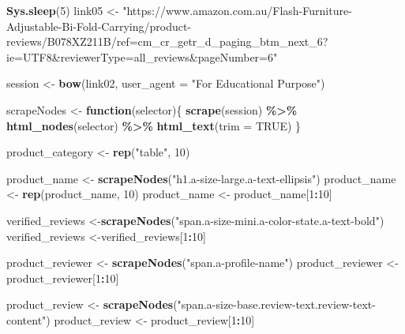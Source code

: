 \documentclass[
]{article}
\newenvironment{Shaded}{\begin{snugshade}}{\end{snugshade}}
\newcommand{\AttributeTok}[1]{\textcolor[rgb]{0.13,0.29,0.53}{#1}}
\newcommand{\ConstantTok}[1]{\textcolor[rgb]{0.56,0.35,0.01}{#1}}
\newcommand{\ControlFlowTok}[1]{\textcolor[rgb]{0.13,0.29,0.53}{\textbf{#1}}}
\newcommand{\DecValTok}[1]{\textcolor[rgb]{0.00,0.00,0.81}{#1}}
\newcommand{\FunctionTok}[1]{\textcolor[rgb]{0.13,0.29,0.53}{\textbf{#1}}}
\newcommand{\NormalTok}[1]{#1}
\newcommand{\OtherTok}[1]{\textcolor[rgb]{0.56,0.35,0.01}{#1}}
\newcommand{\SpecialCharTok}[1]{\textcolor[rgb]{0.81,0.36,0.00}{\textbf{#1}}}
\newcommand{\StringTok}[1]{\textcolor[rgb]{0.31,0.60,0.02}{#1}}
\begin{document}
\begin{Shaded}
\begin{Highlighting}[]
   \FunctionTok{Sys.sleep}\NormalTok{(}\DecValTok{5}\NormalTok{)}
\NormalTok{link05 }\OtherTok{\textless{}{-}} \StringTok{"https://www.amazon.com.au/Flash{-}Furniture{-}Adjustable{-}Bi{-}Fold{-}Carrying/product{-}reviews/B078XZ211B/ref=cm\_cr\_getr\_d\_paging\_btm\_next\_6?ie=UTF8\&reviewerType=all\_reviews\&pageNumber=6"}


\NormalTok{  session }\OtherTok{\textless{}{-}} \FunctionTok{bow}\NormalTok{(link02,}
               \AttributeTok{user\_agent =} \StringTok{"For Educational Purpose"}\NormalTok{)}

\NormalTok{  scrapeNodes }\OtherTok{\textless{}{-}} \ControlFlowTok{function}\NormalTok{(selector)\{}
    \FunctionTok{scrape}\NormalTok{(session) }\SpecialCharTok{\%\textgreater{}\%}
      \FunctionTok{html\_nodes}\NormalTok{(selector) }\SpecialCharTok{\%\textgreater{}\%}
      \FunctionTok{html\_text}\NormalTok{(}\AttributeTok{trim =} \ConstantTok{TRUE}\NormalTok{)}
\NormalTok{  \}}

\NormalTok{  product\_category }\OtherTok{\textless{}{-}} \FunctionTok{rep}\NormalTok{(}\StringTok{"table"}\NormalTok{, }\DecValTok{10}\NormalTok{)}

\NormalTok{  product\_name }\OtherTok{\textless{}{-}} \FunctionTok{scrapeNodes}\NormalTok{(}\StringTok{"h1.a{-}size{-}large.a{-}text{-}ellipsis"}\NormalTok{)}
\NormalTok{  product\_name }\OtherTok{\textless{}{-}} \FunctionTok{rep}\NormalTok{(product\_name, }\DecValTok{10}\NormalTok{)}
\NormalTok{  product\_name }\OtherTok{\textless{}{-}}\NormalTok{ product\_name[}\DecValTok{1}\SpecialCharTok{:}\DecValTok{10}\NormalTok{]}
  
\NormalTok{  verified\_reviews }\OtherTok{\textless{}{-}}\FunctionTok{scrapeNodes}\NormalTok{(}\StringTok{"span.a{-}size{-}mini.a{-}color{-}state.a{-}text{-}bold"}\NormalTok{)}
\NormalTok{  verified\_reviews }\OtherTok{\textless{}{-}}\NormalTok{verified\_reviews[}\DecValTok{1}\SpecialCharTok{:}\DecValTok{10}\NormalTok{]}
  
\NormalTok{  product\_reviewer }\OtherTok{\textless{}{-}} \FunctionTok{scrapeNodes}\NormalTok{(}\StringTok{"span.a{-}profile{-}name"}\NormalTok{)}
\NormalTok{  product\_reviewer }\OtherTok{\textless{}{-}}\NormalTok{ product\_reviewer[}\DecValTok{1}\SpecialCharTok{:}\DecValTok{10}\NormalTok{]}
  
\NormalTok{  product\_review }\OtherTok{\textless{}{-}} \FunctionTok{scrapeNodes}\NormalTok{(}\StringTok{"span.a{-}size{-}base.review{-}text.review{-}text{-}content"}\NormalTok{)}
\NormalTok{  product\_review }\OtherTok{\textless{}{-}}\NormalTok{ product\_review[}\DecValTok{1}\SpecialCharTok{:}\DecValTok{10}\NormalTok{]}
  

\end{Highlighting}
\end{Shaded}
\end{document}
